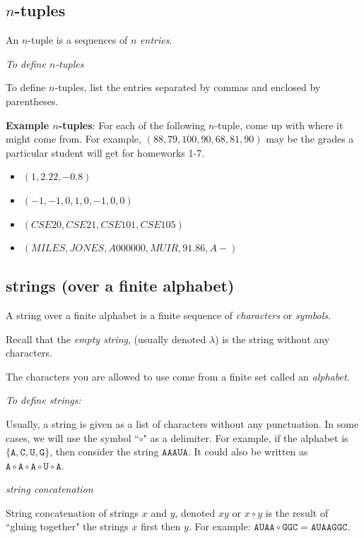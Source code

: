 \documentclass[12pt, oneside]{article}
\newcommand{\A}[0]{\texttt{A}}
\newcommand{\C}[0]{\texttt{C}}
\newcommand{\G}[0]{\texttt{G}}
\newcommand{\U}[0]{\texttt{U}}
\begin{document}
\subsection*{$n$-tuples}

An $n$-tuple is a sequences of $n$ \emph{entries}.

\emph{To define $n$-tuples}

To define $n$-tuples, list the entries separated by commas and enclosed by parentheses.

{\bf Example $n$-tuples}: For each of the following $n$-tuple, come up with where it might come from. For example, $(88, 79, 100, 90, 68, 81,90)$ may be the grades a particular student will get for homeworks 1-7.

\begin{itemize}
    \item[]$(1,2.22, -0.8)$\\
    \item[]$(-1,-1,0,1,0,-1,0,0)$\\
    \item[]$(CSE20, CSE21, CSE101, CSE105)$\\
    \item[]$(MILES,JONES,A000000,MUIR,91.86,A-)$
\end{itemize}


\newpage

\subsection*{strings (over a finite alphabet)}

A string over a finite alphabet is a finite sequence of \emph{characters} or \emph{symbols}.

Recall that the \emph{empty string}, (usually denoted $\lambda$) is the string without any characters.

The characters you are allowed to use come from a finite set called an \emph{alphabet}.

\emph{To define strings:}

Usually, a string is given as a list of characters without any punctuation. In some cases, we will use the symbol ``$\circ$" as a delimiter. For example, if the alphabet is $\{\A,\C,\U,\G\}$, then consider the string $\A\A\A\U\A$. It could also be written as $\A\circ\A\circ\A\circ\U\circ\A$.

\emph{string concatenation}

String concatenation of strings $x$ and $y$, denoted $xy$ or $x\circ y$ is the result of ``gluing together" the strings $x$ first then $y$. For example: $\A\U\A\A\circ \G\G\C=\A\U\A\A\G\G\C$.
\end{document}

